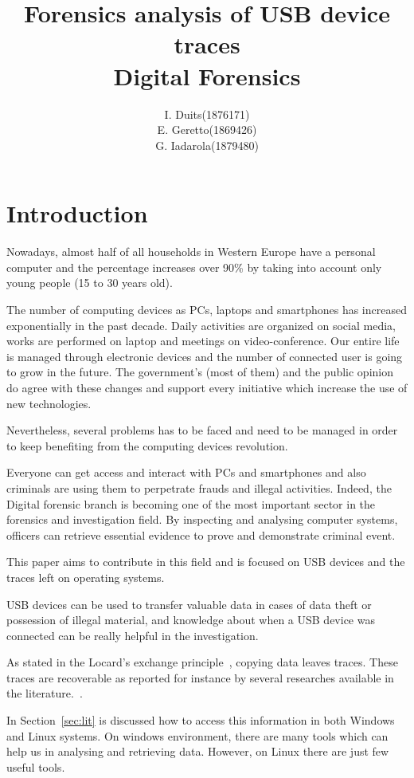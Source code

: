 \documentclass[a4paper]{article}
\title{Forensics analysis of USB device traces\\
\large Digital Forensics}
\author{
\begin{tabular}{>{\raggedleft}m{5cm}m{5cm}}
I. Duits & (1876171) \\
E. Geretto & (1869426) \\
G. Iadarola & (1879480) \\
\end{tabular}
}
\begin{document}
\maketitle

\section{Introduction}
Nowadays, almost half of all households in Western Europe have a personal
computer and the percentage increases over 90\% by taking into account only
young people (15 to 30 years old).

The number of computing devices as PCs, laptops and smartphones has increased
exponentially in the past decade. Daily activities are organized on social
media, works are performed on laptop and meetings on video-conference. Our
entire life is managed through electronic devices and the number of connected
user is going to grow in the future. The government's (most of them) and the
public opinion do agree with these changes and support every initiative which
increase the use of new technologies.

Nevertheless, several problems has to be faced and need to be managed in order
to keep benefiting from the computing devices revolution.

Everyone can get access and interact with PCs and smartphones and also criminals
are using them to perpetrate frauds and illegal activities. Indeed, the Digital
forensic branch is becoming one of the most important sector in the forensics
and investigation field. By inspecting and analysing computer systems, officers
can retrieve essential evidence to prove and demonstrate criminal event.

This paper aims to contribute in this field and is focused on USB devices and
the traces left on operating systems.

USB devices can be used to transfer valuable data in cases of data theft or
possession of illegal material, and knowledge about when a USB device was
connected can be really helpful in the investigation.

As stated in the Locard's exchange principle~\cite{locard2008locard}, copying
data leaves traces. These traces are recoverable as reported for instance by
several researches available in the literature.~\cite{Tanushree12,Abhijeet14}.

In Section~\ref{sec:lit} is discussed how to access this information in both
Windows and Linux systems. On windows environment, there are many tools which
can help us in analysing and retrieving data. However, on Linux there are just
few useful tools.
\end{document}
